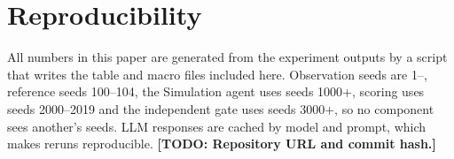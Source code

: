 \documentclass[conference]{IEEEtran}
\newcommand{\todo}[1]{{\color{red}\textbf{[TODO: #1]}}}
\begin{document}
\section*{Reproducibility}
All numbers in this paper are generated from the experiment outputs by a script that writes the table and
macro files included here. Observation seeds are 1--\Nseeds{}, reference seeds 100--104, the Simulation agent
uses seeds 1000+, scoring uses seeds 2000--2019 and the independent gate uses seeds 3000+, so no component
sees another's seeds. LLM responses are cached by model and prompt, which makes reruns reproducible.
\todo{Repository URL and commit hash.}



\end{document}
